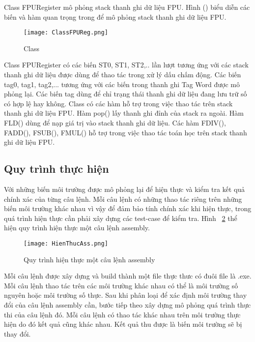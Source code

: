 		\newpage
		Class FPURegister mô phỏng stack thanh ghi dữ liệu FPU. Hình () biểu diễn các biến và hàm quan trọng trong để mô phỏng stack thanh ghi dữ liệu FPU.	
	\begin{center}
			\begin{figure}[htp]
				\begin{center}
					\texttt{[image: ClassFPUReg.png]}
				\end{center}
				\caption{Class	}	
					\label{fig:ClassFlag}		
			\end{figure}
		\end{center}			
	
		Class FPURegister có các biến ST0, ST1, ST2,.. lần lượt tương ứng với các stack thanh ghi dữ liệu được dùng để thao tác trong xử lý dấu chấm động. Các biến tag0, tag1, tag2,... tương ứng với các biến trong thanh ghi Tag Word được mô phỏng lại. Các biến tag dùng để chỉ trạng thái thanh ghi dữ liệu đang lưu trữ số có hợp lệ hay không. Class có các hàm hỗ trợ trong việc thao tác trên stack thanh ghi dữ liệu FPU. Hàm pop() lấy thanh ghi đỉnh của stack ra ngoài. Hàm FLD() dùng để nạp giá trị vào stack thanh ghi dữ liệu. Các hàm FDIV(), FADD(), FSUB(), FMUL() hỗ trợ trong việc thao tác toán học trên stack thanh ghi dữ liệu FPU.
		
		\newpage
		\subsection{Quy trình thực hiện}		
		Với những biến môi trường được mô phỏng lại để hiện thực và kiểm tra kết quả chính xác của từng câu lệnh. Mỗi câu lệnh có những thao tác riêng trên những biến môi trường khác nhau vì vậy để đảm bảo tính chính xác khi hiện thực, trong quá trình hiện thực cần phải xây dựng các test-case để kiểm tra. Hình ~\ref{fig:HienThucAss} thể hiện quy trình hiện thực một câu lệnh assembly.
		\begin{center}
			\begin{figure}[htp]
				\begin{center}
					\texttt{[image: HienThucAss.png]}
				\end{center}
				\caption{Quy trình hiện thực một câu lệnh assembly}	
					\label{fig:HienThucAss}		
			\end{figure}
		\end{center}		
				
		Mỗi câu lệnh được xây dựng và build thành một file thực thưc có đuôi file là .exe. Mỗi câu lệnh thao tác trên các môi trường khác nhau có thể là môi trường số nguyên hoặc môi trường số thực. Sau khi phân loại để xác định môi trường thay đổi của câu lệnh assembly cần, bước tiếp theo xây dựng mô phỏng quá trình thực thi của câu lệnh đó. Mỗi câu lệnh có thao tác khác nhau trên môi trường thực hiện do đó kết quả cũng khác nhau. Kết quả thu được là biến môi trường sẽ bị thay đổi.\\
		
